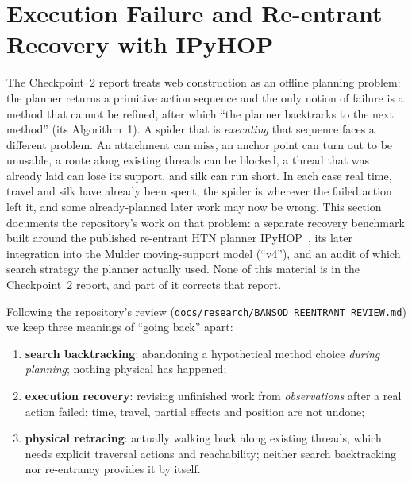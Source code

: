 \section{Execution Failure and Re-entrant Recovery with IPyHOP}
\label{sec:recovery}

The Checkpoint~2 report treats web construction as an offline planning problem: the planner returns a
primitive action sequence and the only notion of failure is a method that cannot be refined, after which
``the planner backtracks to the next method'' (its Algorithm~1). A spider that is \emph{executing} that
sequence faces a different problem. An attachment can miss, an anchor point can turn out to be unusable,
a route along existing threads can be blocked, a thread that was already laid can lose its support, and
silk can run short. In each case real time, travel and silk have already been spent, the spider is
wherever the failed action left it, and some already-planned later work may now be wrong. This section
documents the repository's work on that problem: a separate recovery benchmark built around the published
re-entrant HTN planner IPyHOP~\cite{bansod2021reentrant,bansod2022middle}, its later integration into the
Mulder moving-support model (``v4''), and an audit of which search strategy the planner actually used.
None of this material is in the Checkpoint~2 report, and part of it corrects that report.

Following the repository's review (\texttt{docs/research/BANSOD\_REENTRANT\_REVIEW.md}) we keep three
meanings of ``going back'' apart:
\begin{enumerate}
  \item \textbf{search backtracking}: abandoning a hypothetical method choice \emph{during planning};
        nothing physical has happened;
  \item \textbf{execution recovery}: revising unfinished work from \emph{observations} after a real action
        failed; time, travel, partial effects and position are not undone;
  \item \textbf{physical retracing}: actually walking back along existing threads, which needs explicit
        traversal actions and reachability; neither search backtracking nor re-entrancy provides it by
        itself.
\end{enumerate}

